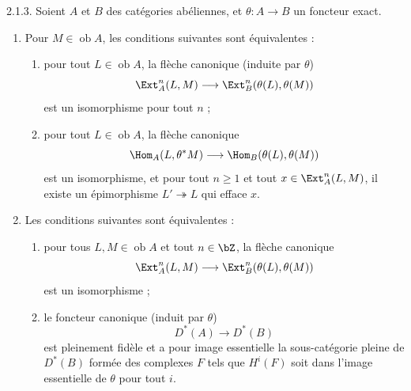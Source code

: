 \begin{lemme} 2.1.3.
Soient $A$ et $B$ des cat\'{e}gories ab\'{e}liennes, et $\theta : A \rightarrow B$ un foncteur exact.
\begin{enumerate}
\item[a)] Pour $M \in \operatorname{ob} A$, les conditions suivantes sont \'{e}quivalentes :
\begin{enumerate}
\item[(i)] pour tout $L \in \operatorname{ob} A$, la fl\`{e}che canonique (induite par $\theta$)
\[
\Ext_A^n(L,M) \longrightarrow \Ext_B^n(\theta(L), \theta(M))
\]
est un isomorphisme pour tout $n$ ;
\item[(ii)] pour tout $L \in \operatorname{ob} A$, la fl\`{e}che canonique
\[
\Hom_A(L,\theta^*M) \longrightarrow \Hom_B(\theta(L), \theta(M))
\]
est un isomorphisme, et pour tout $n \geq 1$ et tout $x \in \Ext_A^n(L,M)$, il existe un \'{e}pimorphisme $L' \twoheadrightarrow L$ qui efface $x$.
\end{enumerate}
\item[b)] Les conditions suivantes sont \'{e}quivalentes :
\begin{enumerate}
\item[(i)] pour tous $L, M \in \operatorname{ob} A$ et tout $n \in \bZ$, la fl\`{e}che canonique
\[
\Ext_A^n(L,M) \longrightarrow \Ext_B^n(\theta(L), \theta(M))
\]
est un isomorphisme ;
\item[(ii)] le foncteur canonique (induit par $\theta$)
\[
D^*(A) \longrightarrow D^*(B)
\]
est pleinement fid\`{e}le et a pour image essentielle la sous-cat\'{e}gorie pleine de $D^*(B)$ form\'{e}e des complexes $F$ tels que $H^i(F)$ soit dans l'image essentielle de $\theta$ pour tout $i$.
\end{enumerate}
\end{enumerate}
\end{lemme}

